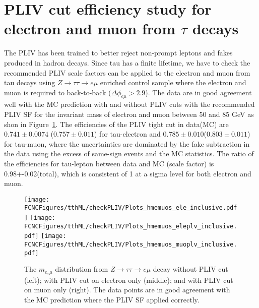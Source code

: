 \section{PLIV cut efficiency study for electron and muon from $\tau$ decays}
\label{sec:CheckPLIV}

The PLIV has been trained to better reject non-prompt leptons and fakes produced in hadron decays. Since tau has a finite lifetime, we have to check the
recommended PLIV scale factors can be applied to the electron and muon from tau decays using $Z\rightarrow \tau\tau\rightarrow e\mu$ enriched control sample
where the electron and muon is required to back-to-back ($\Delta\phi_{e\mu}>2.9$). The data are in good agreement well with the MC prediction with and without
PLIV cuts with the recommended PLIV SF for the invariant mass of electron and muon between 50 and 85 GeV as shon in Figure~\ref{fig:ap9_checkpliv}. The efficiencies of
the PLIV tight cut in data(MC) are $0.741\pm 0.0074$ ($0.757\pm 0.011$) for tau-electron and $0.785\pm 0.010$($0.803\pm 0.011$) for tau-muon, where the uncertainties are
dominated by the fake subtraction in the data using the excess of same-sign events and the MC statistics. The ratio of the efficiencies for tau-lepton between data
and MC (scale factor) is 0.98+-0.02(total), which is consistent of 1 at a sigma level for both electron and muon. 

\begin{figure}[H]
\centering
\texttt{[image: \\FCNCFigures/tthML/checkPLIV/Plots\_hmemuos\_ele\_inclusive.pdf]}
\texttt{[image: \\FCNCFigures/tthML/checkPLIV/Plots\_hmemuos\_eleplv\_inclusive.pdf]}
\texttt{[image: \\FCNCFigures/tthML/checkPLIV/Plots\_hmemuos\_muoplv\_inclusive.pdf]}
\caption{ The $m_{e,\mu}$ distribution from $Z\rightarrow\tau\tau\rightarrow e\mu$ decay without PLIV cut (left); with PLIV cut on electron only (middle); and
  with PLIV cut on muon only (right). The data points are in good agreement with the MC prediction where the PLIV SF applied correctly.}
\label{fig:ap9_checkpliv}
\end{figure}

